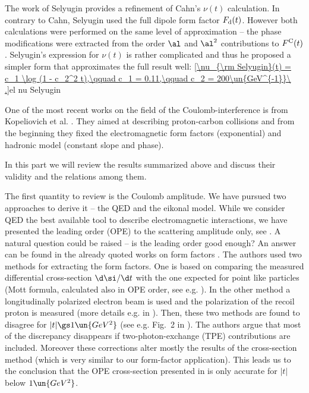 The work of Selyugin  provides a refinement of Cahn's $\nu(t)$ calculation. In contrary to Cahn, Selyugin used the full dipole form factor $F_{\rm d}(t)$. However both calculations were performed on the same level of approximation -- the phase modifications were extracted from the order $\al$ and $\al^2$ contributions to $F^{\rm C}(t)$. Selyugin's expression for $\nu(t)$ is rather complicated and thus he proposed a simpler form that approximates the full result well:
\eqref{\nu_{\rm Selyugin}(t) = c_1 \log (1 - c_2^2 t),\qquad c_1 = 0.11,\qquad c_2 = 200\un{GeV^{-1}}\ .}{el nu Selyugin}

One of the most recent works on the field of the Coulomb-interference is from Kopeliovich et al. . They aimed at describing proton-carbon collisions and from the beginning they fixed the electromagnetic form factors (exponential) and hadronic model (constant slope and phase).


In this part we will review the results summarized above and discuss their validity and the relations among them.


The first quantity to review is the Coulomb amplitude. We have pursued two approaches to derive it -- the QED and the eikonal model. While we consider QED the best available tool to describe electromagnetic interactions, we have presented the leading order (OPE) to the scattering amplitude only, see . A natural question could be raised -- is the leading order good enough? An answer can be found in the already quoted works on form factors . The authors used two methods for extracting the form factors. One is based on comparing the measured differential cross-section $\d\si/\d t$ with the one expected for point like particles (Mott formula, calculated also in OPE order, see e.g. ). In the other method a longitudinally polarized electron beam is used and the polarization of the recoil proton is measured (more details e.g. in ). Then, these two methods are found to disagree for $|t| \gs 1\un{GeV^2}$ (see e.g. Fig.~2 in ). The authors argue that most of the discrepancy disappears if two-photon-exchange (TPE) contributions are included. Moreover these corrections alter mostly the results of the cross-section method (which is very similar to our form-factor application). This leads us to the conclusion that the OPE cross-section presented in  is only accurate for $|t|$ below $1\un{GeV^2}$.

